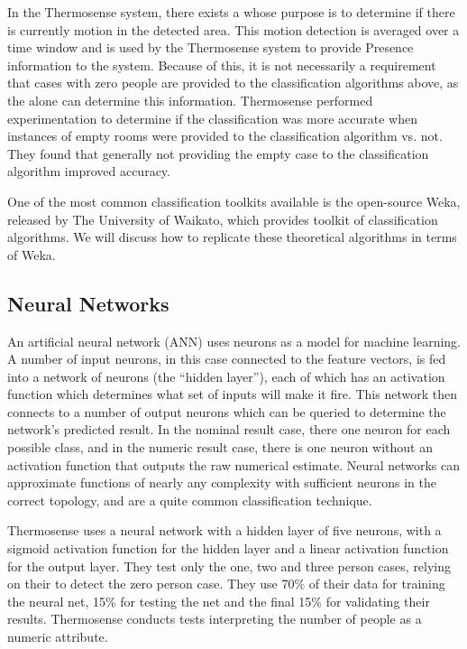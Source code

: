 \documentclass[../thesis/thesis.tex]{subfiles}
\begin{document}
In the Thermosense system, there exists a \pir whose purpose is to determine if there is currently motion in the detected area. This motion detection is averaged over a time window and is used by the Thermosense system to provide Presence information to the system. Because of this, it is not necessarily a requirement that cases with zero people are provided to the classification algorithms above, as the \pir alone can determine this information. Thermosense performed experimentation to determine if the classification was more accurate when instances of empty rooms were provided to the classification algorithm vs. not. They found that generally not providing the empty case to the classification algorithm improved accuracy.

One of the most common classification toolkits available is the open-source Weka, released by The University of Waikato, which provides toolkit of classification algorithms. We will discuss how to replicate these theoretical algorithms in terms of Weka.

\subsection{Neural Networks}
An artificial neural network (ANN) uses neurons as a model for machine learning. A number of input neurons, in this case connected to the feature vectors, is fed into a network of neurons (the ``hidden layer''), each of which has an activation function which determines what set of inputs will make it fire. This network then connects to a number of output neurons which can be queried to determine the network's predicted result. In the nominal result case, there one neuron for each possible class, and in the numeric result case, there is one neuron without an activation function that outputs the raw numerical estimate. Neural networks can approximate functions of nearly any complexity with sufficient neurons in the correct topology, and are a quite common classification technique.

Thermosense uses a neural network with a hidden layer of five neurons, with a sigmoid activation function for the hidden layer and a linear activation function for the output layer. They test only the one, two and three person cases, relying on their \pir to detect the zero person case. They use 70\% of their data for training the neural net, 15\% for testing the net and the final 15\% for validating their results. Thermosense conducts tests interpreting the number of people as a numeric attribute.
\end{document}
